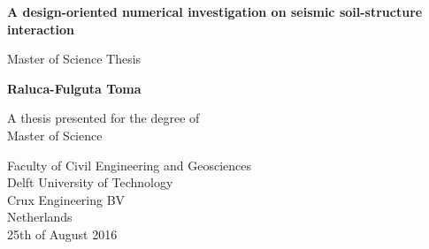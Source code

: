\documentclass[11pt,a4paper]{report}
\begin{document}
	\begin{titlepage}
		\begin{minipage}{49em}
			\noindent{}
			
		\end{minipage}
	\end{titlepage}

	
	\begin{titlepage}
		  \begin{center}
		  	\vspace*{3cm}
		  	
		  	\textbf{\Huge A design-oriented numerical investigation on seismic
		  		soil-structure interaction}
		  	
		  	\vspace{1cm}
		  	{\large Master of Science Thesis}
		  	
		  	\vspace{1.5cm}
		  	
		  	\textbf{\Large Raluca-Fulguta Toma}
		  	
		  	\vfill
		  	
		  	A thesis presented for the degree of\\
		  	Master of Science
		  	
		  	\vspace{0.8cm}
		  
		  	
			Faculty of Civil Engineering and Geosciences\\
		  	Delft University of Technology\\
		  	Crux Engineering BV\\
		  	Netherlands\\
		    25th of August 2016
		  	
		  \end{center}
		
		\thispagestyle{empty}
		

		\clearpage
		\thispagestyle{empty}
					
		

\end{titlepage}
\end{document}
